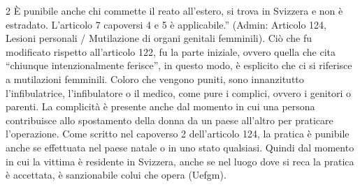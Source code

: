 2 È punibile anche chi commette il reato all'estero, si trova in Svizzera e non è estradato. L'articolo 7 capoversi 4 e 5 è applicabile.” (Admin: Articolo 124, Lesioni personali / Mutilazione di organi genitali femminili). 
Ciò che fu modificato rispetto all’articolo 122, fu la parte iniziale, ovvero quella che cita “chiunque intenzionalmente ferisce”, in questo modo, è esplicito che ci si riferisce a mutilazioni femminili. Coloro che vengono puniti, sono innanzitutto l’infibulatrice, l’infibulatore o il medico, come pure i complici, ovvero i genitori o parenti. La complicità è presente anche dal momento in cui una persona contribuisce allo spostamento della donna da un paese all’altro per praticare l’operazione. Come scritto nel capoverso 2 dell’articolo 124, la pratica è punibile anche se effettuata nel paese natale o in uno stato qualsiasi. Quindi dal momento in cui la vittima è residente in Svizzera, anche se nel luogo dove si reca la pratica è accettata, è sanzionabile colui che opera (Uefgm).
